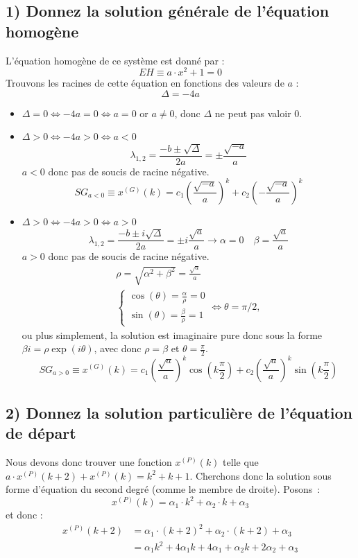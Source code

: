 \documentclass[11pt,a4paper]{report}
\begin{document}
		\subsection*{1) Donnez la solution générale de l'équation homogène}
		L'équation homogène de ce système est donné par :
		\[
			EH \equiv a \cdot x^2 + 1 = 0
		\]
		Trouvons les racines de cette équation en fonctions des valeurs de $a$ :
		\[
			\Delta = -4a
		\]
		\begin{itemize}
			\item $\Delta = 0 \Leftrightarrow -4a = 0 \Leftrightarrow a = 0$ or $a \neq 0$, donc $\Delta$ ne peut pas valoir $0$.
			\item $\Delta > 0 \Leftrightarrow -4a > 0 \Leftrightarrow a < 0$\\
				\[
					\lambda_{1,2} = \frac{-b \pm \sqrt{\Delta}}{2a} = \pm \frac{\sqrt{-a}}{a}
				\]
				$a < 0$ donc pas de soucis de racine négative.
				\[
					SG_{a<0} \equiv  x^{(G)}(k) = c_1 \left(\frac{\sqrt{-a}}{a} \right)^k + c_2\left(-\frac{\sqrt{-a}}{a}\right)^k
				\]

			\item $\Delta > 0 \Leftrightarrow -4a > 0 \Leftrightarrow a > 0$\\
				\[
					\lambda_{1,2} = \frac{-b \pm i\sqrt{\Delta}}{2a} = \pm i\frac{\sqrt{a}}{a} \rightarrow \alpha = 0 \quad \beta = \frac{\sqrt{a}}{a}
				\]
				$a > 0$ donc pas de soucis de racine négative.
				\begin{gather*}
					\rho = \sqrt{\alpha^2 + \beta^2} = \frac{\sqrt{a}}{a} \\
					\begin{cases}
						\cos(\theta) = \frac{\alpha}{\rho} = 0\\
						\sin(\theta) = \frac{\beta}{\rho} = 1
					\end{cases}
					\Leftrightarrow \theta = \pi/2,
				\end{gather*}
				ou plus simplement, la solution est imaginaire pure donc sous la forme $\beta i = \rho\exp(i\theta)$, avec donc $\rho = \beta$ et $\theta = \frac \pi2$.
				\[
					SG_{a>0} \equiv  x^{(G)}(k) = c_1 \left(\frac{\sqrt{a}}{a} \right)^k \cos\left(k \frac{\pi}{2}\right) + c_2\left(\frac{\sqrt{a}}{a}\right)^k \sin\left(k \frac{\pi}{2}\right)
				\]
		\end{itemize}

		\subsection*{2) Donnez la solution particulière de l'équation de départ}
			Nous devons donc trouver une fonction $x^{(P)}(k)$ telle que $a \cdot x^{(P)}(k+2) + x^{(P)}(k) = k^2 + k + 1$. Cherchons donc la solution sous forme d'équation du second degré
			(comme le membre de droite). Posons~:
			\[
				x^{(P)}(k) = \alpha_1 \cdot k^2 + \alpha_2 \cdot k + \alpha_3
			\]
			et donc :
			\begin{align*}
				x^{(P)}(k+2) &= \alpha_1 \cdot (k+2)^2 + \alpha_2 \cdot (k+2) + \alpha_3 \\
					&= \alpha_1 k^2 + 4\alpha_1k + 4\alpha_1 + \alpha_2 k + 2\alpha_2 + \alpha_3
			\end{align*}
\end{document}
